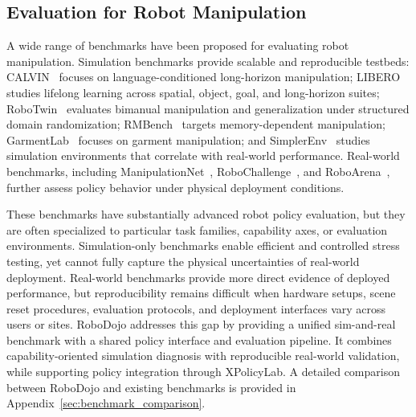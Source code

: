 \subsection{Evaluation for Robot Manipulation}

A wide range of benchmarks have been proposed for evaluating robot manipulation. Simulation benchmarks provide scalable and reproducible testbeds: CALVIN~\citep{mees2022calvin} focuses on language-conditioned long-horizon manipulation; LIBERO~\citep{liu2023libero} studies lifelong learning across spatial, object, goal, and long-horizon suites; RoboTwin~\citep{chen2025robotwin} evaluates bimanual manipulation and generalization under structured domain randomization; RMBench~\citep{chen2026rmbench} targets memory-dependent manipulation; GarmentLab~\citep{lu2024garmentlab} focuses on garment manipulation; and SimplerEnv~\citep{li2024evaluatingrealworldrobotmanipulation} studies simulation environments that correlate with real-world performance. Real-world benchmarks, including ManipulationNet~\citep{chen2026manipulationnet}, RoboChallenge~\citep{yakefu2025robochallenge}, and RoboArena~\citep{atreya2025roboarena}, further assess policy behavior under physical deployment conditions.

These benchmarks have substantially advanced robot policy evaluation, but they are often specialized to particular task families, capability axes, or evaluation environments. Simulation-only benchmarks enable efficient and controlled stress testing, yet cannot fully capture the physical uncertainties of real-world deployment. Real-world benchmarks provide more direct evidence of deployed performance, but reproducibility remains difficult when hardware setups, scene reset procedures, evaluation protocols, and deployment interfaces vary across users or sites. RoboDojo addresses this gap by providing a unified sim-and-real benchmark with a shared policy interface and evaluation pipeline. It combines capability-oriented simulation diagnosis with reproducible real-world validation, while supporting policy integration through XPolicyLab. A detailed comparison between RoboDojo and existing benchmarks is provided in Appendix~\ref{sec:benchmark_comparison}.



